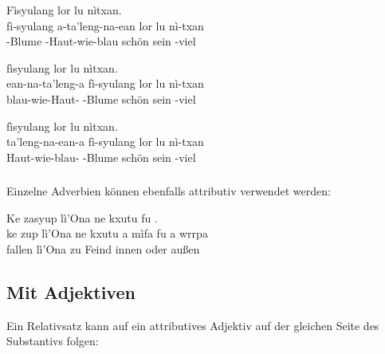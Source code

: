 \begin{interlin} 
	\glll \Npawl{}Fìsyulang  lor lu nìtxan. \\
	fì-syulang a-ta'leng-na-ean lor lu nì-txan \\
	-Blume -Haut-wie-blau schön sein -viel \\
\end{interlin}

\begin{interlin} 
	\glll \Npawl{} fìsyulang lor lu nìtxan. \\
	ean-na-ta'leng-a fì-syulang lor lu nì-txan \\
	blau-wie-Haut- -Blume schön sein -viel \\
\end{interlin}

\begin{interlin} 
	\glll \Npawl{} fìsyulang lor lu nìtxan. \\
	ta'leng-na-ean-a fì-syulang lor lu nì-txan \\
	Haut-wie-blau- -Blume schön sein -viel \\
\end{interlin}

\subsubsection{} Einzelne Adverbien können ebenfalls attributiv verwendet werden:

\begin{interlin}
	\glll \Npawl{}Ke zasyup lì'Ona ne kxutu   fu  . \\
	ke zup lì'Ona ne kxutu a mìfa fu a wrrpa \\
	 fallen lì'Ona zu Feind  innen oder  außen\\
\end{interlin}

\subsection{Mit Adjektiven} 
Ein Relativsatz kann auf ein attributives Adjektiv auf der gleichen Seite des Substantivs folgen:

